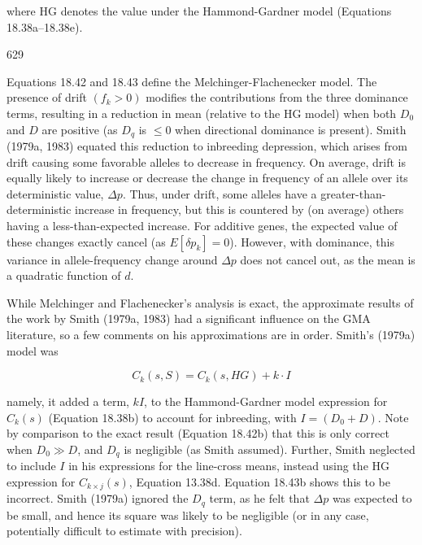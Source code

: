 \documentclass{article}
\begin{document}
where HG denotes the value under the Hammond-Gardner model (Equations 18.38a–18.38e).

629

Equations 18.42 and 18.43 define the Melchinger-Flachenecker model. The presence of drift  $ (f_k > 0) $ modifies the contributions from the three dominance terms, resulting in a reduction in mean (relative to the HG model) when both  $ D_0 $ and  $ D $ are positive (as  $ D_q $ is  $ \leq 0 $ when directional dominance is present). Smith (1979a, 1983) equated this reduction to inbreeding depression, which arises from drift causing some favorable alleles to decrease in frequency. On average, drift is equally likely to increase or decrease the change in frequency of an allele over its deterministic value,  $ \Delta p $. Thus, under drift, some alleles have a greater-than-deterministic increase in frequency, but this is countered by (on average) others having a less-than-expected increase. For additive genes, the expected value of these changes exactly cancel (as  $ E[\delta p_k] = 0 $). However, with dominance, this variance in allele-frequency change around  $ \Delta p $ does not cancel out, as the mean is a quadratic function of  $ d $.

While Melchinger and Flachenecker’s analysis is exact, the approximate results of the work by Smith (1979a, 1983) had a significant influence on the GMA literature, so a few comments on his approximations are in order. Smith’s (1979a) model was

\begin{equation}
C_{k}(s,S)=C_{k}(s,HG)+k\cdot I
\tag{18.44}
\label{eq:18_44}
\end{equation}

namely, it added a term,  $ kI $, to the Hammond-Gardner model expression for  $ C_k(s) $ (Equation 18.38b) to account for inbreeding, with  $ I = (D_0 + D) $. Note by comparison to the exact result (Equation 18.42b) that this is only correct when  $ D_0 \gg D $, and  $ D_q $ is negligible (as Smith assumed). Further, Smith neglected to include  $ I $ in his expressions for the line-cross means, instead using the HG expression for  $ C_{k \times j}(s) $, Equation 13.38d. Equation 18.43b shows this to be incorrect. Smith (1979a) ignored the  $ D_q $ term, as he felt that  $ \Delta p $ was expected to be small, and hence its square was likely to be negligible (or in any case, potentially difficult to estimate with precision).
\end{document}
